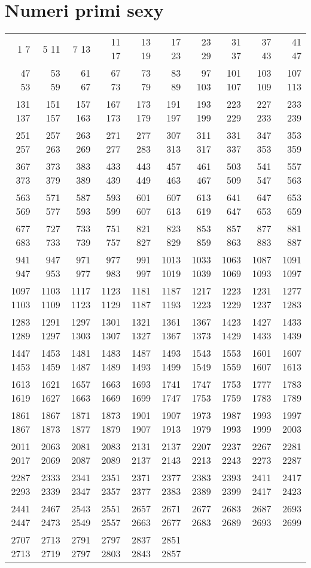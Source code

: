 \section{Numeri primi sexy}
\begin{center}
 \footnotesize
 \begin{tabular}{*{10}{r}}
  \toprule 
1 7 & 5 11 & 7 13 & 11 17 & 13 19 & 17 23 & 23 29 & 31 37 & 37 43 & 41 47\\
47 53 & 53 59 & 61 67 & 67 73 & 73 79 & 83 89 & 97 103 & 101 107 & 103 109 & 107 113\\
131 137 & 151 157 & 157 163 & 167 173 & 173 179 & 191 197 & 193 199 & 223 229 & 227 233 & 233 239\\
251 257 & 257 263 & 263 269 & 271 277 & 277 283 & 307 313 & 311 317 & 331 337 & 347 353 & 353 359\\
367 373 & 373 379 & 383 389 & 433 439 & 443 449 & 457 463 & 461 467 & 503 509 & 541 547 & 557 563\\
563 569 & 571 577 & 587 593 & 593 599 & 601 607 & 607 613 & 613 619 & 641 647 & 647 653 & 653 659\\
677 683 & 727 733 & 733 739 & 751 757 & 821 827 & 823 829 & 853 859 & 857 863 & 877 883 & 881 887\\
941 947 & 947 953 & 971 977 & 977 983 & 991 997 & 1013 1019 & 1033 1039 & 1063 1069 & 1087 1093 & 1091 1097\\
1097 1103 & 1103 1109 & 1117 1123 & 1123 1129 & 1181 1187 & 1187 1193 & 1217 1223 & 1223 1229 & 1231 1237 & 1277 1283\\
1283 1289 & 1291 1297 & 1297 1303 & 1301 1307 & 1321 1327 & 1361 1367 & 1367 1373 & 1423 1429 & 1427 1433 & 1433 1439\\
1447 1453 & 1453 1459 & 1481 1487 & 1483 1489 & 1487 1493 & 1493 1499 & 1543 1549 & 1553 1559 & 1601 1607 & 1607 1613\\
1613 1619 & 1621 1627 & 1657 1663 & 1663 1669 & 1693 1699 & 1741 1747 & 1747 1753 & 1753 1759 & 1777 1783 & 1783 1789\\
1861 1867 & 1867 1873 & 1871 1877 & 1873 1879 & 1901 1907 & 1907 1913 & 1973 1979 & 1987 1993 & 1993 1999 & 1997 2003\\
2011 2017 & 2063 2069 & 2081 2087 & 2083 2089 & 2131 2137 & 2137 2143 & 2207 2213 & 2237 2243 & 2267 2273 & 2281 2287\\
2287 2293 & 2333 2339 & 2341 2347 & 2351 2357 & 2371 2377 & 2377 2383 & 2383 2389 & 2393 2399 & 2411 2417 & 2417 2423\\
2441 2447 & 2467 2473 & 2543 2549 & 2551 2557 & 2657 2663 & 2671 2677 & 2677 2683 & 2683 2689 & 2687 2693 & 2693 2699\\
2707 2713 & 2713 2719 & 2791 2797 & 2797 2803 & 2837 2843 & 2851 2857 \\ 
  \bottomrule
 \end{tabular}
\end{center}
